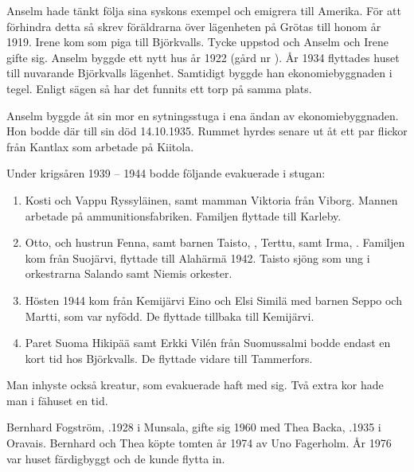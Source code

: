 Anselm hade tänkt följa sina syskons exempel och emigrera till Amerika. För att förhindra detta så skrev föräldrarna över lägenheten på Grötas till honom år 1919. Irene kom som piga till Björkvalls. Tycke uppstod och Anselm och Irene gifte sig. Anselm byggde ett nytt hus år 1922 (gård nr ). År 1934 flyttades huset till nuvarande Björkvalls lägenhet. Samtidigt byggde han ekonomiebyggnaden i tegel. Enligt sägen så har det funnits ett torp på samma plats.




Anselm byggde åt sin mor en sytningsstuga i ena ändan av ekonomiebyggnaden. Hon bodde där till sin död 14.10.1935.
Rummet hyrdes senare ut  åt ett par flickor från Kantlax som 	arbetade på Kiitola.

Under krigsåren 1939 – 1944 bodde följande evakuerade i stugan:
\begin{enumerate}
  \item Kosti och Vappu Ryssyläinen, samt mamman Viktoria från Viborg. Mannen arbetade på ammunitionsfabriken. Familjen
	flyttade till Karleby.
  \item Otto,  och hustrun Fenna,  samt barnen Taisto, , Terttu,  samt Irma, . Familjen kom från Suojärvi, flyttade till Alahärmä 1942. Taisto sjöng som ung i orkestrarna Salando samt Niemis orkester.
  \item Hösten 1944 kom från Kemijärvi Eino och Elsi Similä med barnen Seppo och Martti, som var nyfödd. De flyttade tillbaka till Kemijärvi.
  \item Paret Suoma Hikipää samt Erkki Vilén från Suomussalmi bodde endast en kort tid hos Björkvalls. De flyttade vidare till Tammerfors.
\end{enumerate}

Man inhyste också kreatur, som evakuerade haft med sig. Två extra kor hade man i fähuset en tid.






Bernhard Fogström, .1928 i Munsala, gifte sig 1960 med Thea Backa, .1935 i Oravais. Bernhard och Thea köpte tomten år 1974 av Uno Fagerholm. År 1976 var huset färdigbyggt och de kunde flytta in.
\begin{jhchildren}
  \item {}
  \item {}
  \item {}
\end{jhchildren}

